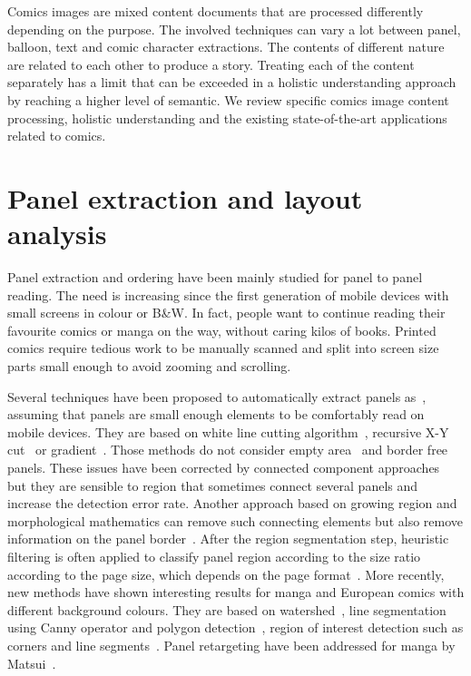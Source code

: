 Comics images are mixed content documents that are processed differently depending on the purpose.
The involved techniques can vary a lot between panel, balloon, text and comic character extractions.
The contents of different nature are related to each other to produce a story.
Treating each of the content separately has a limit that can be exceeded in a holistic understanding approach by reaching a higher level of semantic.
We review specific comics image content processing, holistic understanding and the existing state-of-the-art applications related to comics.%

\section{Panel extraction and layout analysis}
\label{sec:sota:layout_panel}


Panel extraction and ordering have been mainly studied for panel to panel reading.
The need is increasing since the first generation of mobile devices with small screens in colour or B\&W.
In fact, people want to continue reading their favourite comics or manga on the way, without caring kilos of books.
Printed comics require tedious work to be manually scanned and split into screen size parts small enough to avoid zooming and scrolling.

Several techniques have been proposed to automatically extract panels as~\cite{In11}, assuming that panels are small enough elements to be comfortably read on mobile devices.
They are based on white line cutting algorithm~\cite{Duda72,Luyuan2014Automatic,Chan2007Automatic}, recursive X-Y cut~\cite{Han07} or gradient~\cite{Tan07}.
Those methods do not consider empty area~\cite{In11} and border free panels.
These issues have been corrected by connected component approaches~\cite{Arai10} 
but they are sensible to region that sometimes connect several panels and increase the detection error rate.
Another approach based on growing region and morphological mathematics can remove such connecting elements but also remove information on the panel border~\cite{Ho2012}.
After the region segmentation step, heuristic filtering is often applied to classify panel region according to the size ratio according to the page size, which depends on the page format~\cite{Arai11,Ho2012}.
More recently, new methods have shown interesting results for manga and European comics with different background colours.
They are based on watershed~\cite{ponsard2012ocr}, line segmentation using Canny operator and polygon detection~\cite{Luyuan2014Automatic}, region of interest detection such as corners and line segments~\cite{stommel2012segmentation,Tsai2013Adaptive}.
Panel retargeting have been addressed for manga by Matsui~\cite{Matsui2011}.

